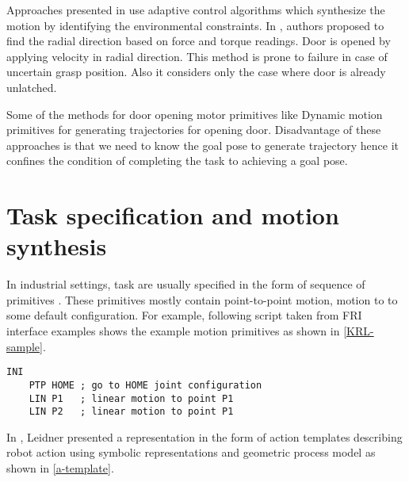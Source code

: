 \documentclass[thesis]{mas_proposal}
\begin{document}
Approaches presented in \cite{levihn2014using,karayiannidis2012adaptive,niemeyer1997simple} use adaptive control algorithms which synthesize the motion by identifying the environmental constraints. In \cite{karayiannidis2012adaptive}, authors proposed to find the radial direction based on force and torque readings. Door is opened by applying velocity in radial direction. This method is prone to failure in case of uncertain grasp position. Also it considers only the case where door is already unlatched. 

Some of the methods for door opening motor primitives like Dynamic motion primitives for generating trajectories for opening door. Disadvantage of these approaches is that we need to know the goal pose to generate trajectory hence it confines the condition of completing the task to achieving a goal pose. 

\section{Task specification and motion synthesis}

In industrial settings, task are usually specified in the form of sequence of primitives \cite{leidner2017cognitive}. These primitives mostly contain point-to-point motion, motion to to some default configuration. For example, following script taken from FRI interface examples shows the example motion primitives as shown in \ref{KRL-sample}.

\begin{lstlisting}[label=KRL-sample,caption=KRL code]
	INI
	PTP HOME ; go to HOME joint configuration
	LIN P1   ; linear motion to point P1
	LIN P2	 ; linear motion to point P1
\end{lstlisting}

In \cite{leidner2017cognitive}, Leidner presented a representation in the form of action templates describing robot action using symbolic representations and geometric process model as shown in \ref{a-template}.  
\end{document}

